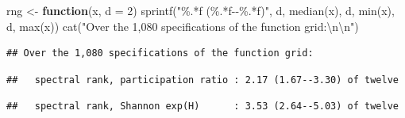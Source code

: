 \documentclass[
  11pt,
]{article}
\newenvironment{Shaded}{\begin{snugshade}}{\end{snugshade}}
\newcommand{\AttributeTok}[1]{\textcolor[rgb]{0.77,0.63,0.00}{#1}}
\newcommand{\ControlFlowTok}[1]{\textcolor[rgb]{0.13,0.29,0.53}{\textbf{#1}}}
\newcommand{\DecValTok}[1]{\textcolor[rgb]{0.00,0.00,0.81}{#1}}
\newcommand{\FunctionTok}[1]{\textcolor[rgb]{0.00,0.00,0.00}{#1}}
\newcommand{\NormalTok}[1]{#1}
\newcommand{\OtherTok}[1]{\textcolor[rgb]{0.56,0.35,0.01}{#1}}
\newcommand{\SpecialCharTok}[1]{\textcolor[rgb]{0.00,0.00,0.00}{#1}}
\newcommand{\StringTok}[1]{\textcolor[rgb]{0.31,0.60,0.02}{#1}}
\begin{document}
\begin{Shaded}
\begin{Highlighting}[]
\NormalTok{rng }\OtherTok{\textless{}{-}} \ControlFlowTok{function}\NormalTok{(x, }\AttributeTok{d =} \DecValTok{2}\NormalTok{) }\FunctionTok{sprintf}\NormalTok{(}\StringTok{"\%.*f (\%.*f{-}{-}\%.*f)"}\NormalTok{, d, }\FunctionTok{median}\NormalTok{(x), d, }\FunctionTok{min}\NormalTok{(x), d, }\FunctionTok{max}\NormalTok{(x))}
\FunctionTok{cat}\NormalTok{(}\StringTok{"Over the 1,080 specifications of the function grid:}\SpecialCharTok{\textbackslash{}n\textbackslash{}n}\StringTok{"}\NormalTok{)}
\end{Highlighting}
\end{Shaded}

\begin{verbatim}
## Over the 1,080 specifications of the function grid:
\end{verbatim}

\begin{Shaded}
\end{Shaded}

\begin{verbatim}
##   spectral rank, participation ratio : 2.17 (1.67--3.30) of twelve
\end{verbatim}

\begin{Shaded}
\end{Shaded}

\begin{verbatim}
##   spectral rank, Shannon exp(H)      : 3.53 (2.64--5.03) of twelve
\end{verbatim}

\begin{Shaded}
\end{Shaded}
\end{document}

